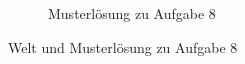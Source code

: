 \begin{figure}[H]
\begin{subfigure}[b]{0.40\textwidth}
    \caption{Musterlösung zu Aufgabe 8}
  \end{subfigure}\hfill
  \caption{Welt und Musterlösung zu Aufgabe 8}
\end{figure}
